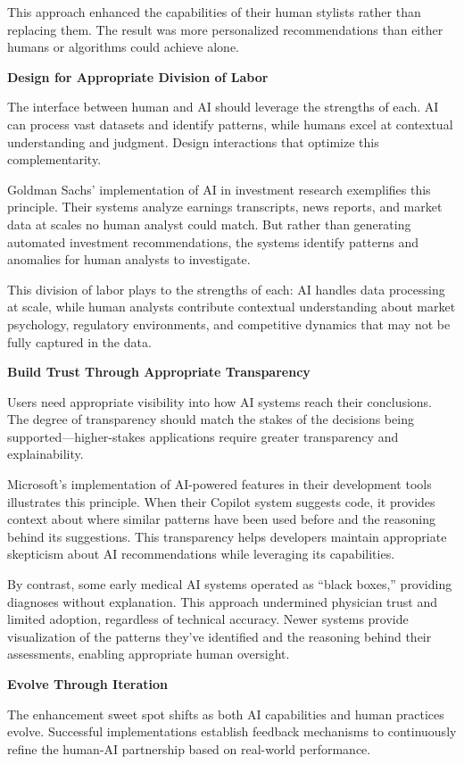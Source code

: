 \documentclass[
  Letterpaper,
]{scrbook}
\begin{document}
This approach enhanced the capabilities of their human stylists rather
than replacing them. The result was more personalized recommendations
than either humans or algorithms could achieve alone.

\textbf{Design for Appropriate Division of Labor}

The interface between human and AI should leverage the strengths of
each. AI can process vast datasets and identify patterns, while humans
excel at contextual understanding and judgment. Design interactions that
optimize this complementarity.

Goldman Sachs' implementation of AI in investment research exemplifies
this principle. Their systems analyze earnings transcripts, news
reports, and market data at scales no human analyst could match. But
rather than generating automated investment recommendations, the systems
identify patterns and anomalies for human analysts to investigate.

This division of labor plays to the strengths of each: AI handles data
processing at scale, while human analysts contribute contextual
understanding about market psychology, regulatory environments, and
competitive dynamics that may not be fully captured in the data.

\textbf{Build Trust Through Appropriate Transparency}

Users need appropriate visibility into how AI systems reach their
conclusions. The degree of transparency should match the stakes of the
decisions being supported---higher-stakes applications require greater
transparency and explainability.

Microsoft's implementation of AI-powered features in their development
tools illustrates this principle. When their Copilot system suggests
code, it provides context about where similar patterns have been used
before and the reasoning behind its suggestions. This transparency helps
developers maintain appropriate skepticism about AI recommendations
while leveraging its capabilities.

By contrast, some early medical AI systems operated as ``black boxes,''
providing diagnoses without explanation. This approach undermined
physician trust and limited adoption, regardless of technical accuracy.
Newer systems provide visualization of the patterns they've identified
and the reasoning behind their assessments, enabling appropriate human
oversight.

\textbf{Evolve Through Iteration}

The enhancement sweet spot shifts as both AI capabilities and human
practices evolve. Successful implementations establish feedback
mechanisms to continuously refine the human-AI partnership based on
real-world performance.
\end{document}
